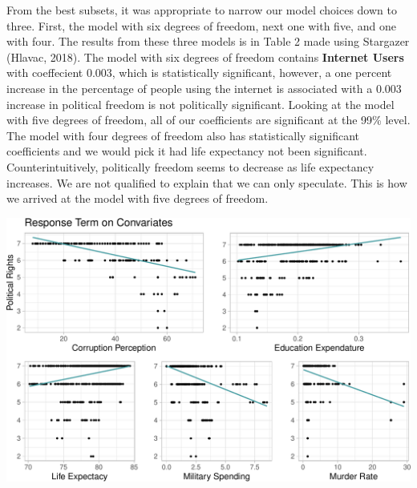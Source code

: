 \documentclass[
  english,
  man,floatsintext]{apa6}
\begin{document}
From the best subsets, it was appropriate to narrow our model choices down to three. First, the model with six degrees of freedom, next one with five, and one with four. The results from these three models is in Table 2 made using Stargazer (Hlavac, 2018). The model with six degrees of freedom contains \textbf{Internet Users} with coeffecient 0.003, which is statistically significant, however, a one percent increase in the percentage of people using the internet is associated with a 0.003 increase in political freedom is not politically significant. Looking at the model with five degrees of freedom, all of our coefficients are significant at the 99\% level. The model with four degrees of freedom also has statistically significant coefficients and we would pick it had life expectancy not been significant. Counterintuitively, politically freedom seems to decrease as life expectancy increases. We are not qualified to explain that we can only speculate. This is how we arrived at the model with five degrees of freedom.

\includegraphics{paper_files/figure-latex/unnamed-chunk-5-1.pdf}
\end{document}
